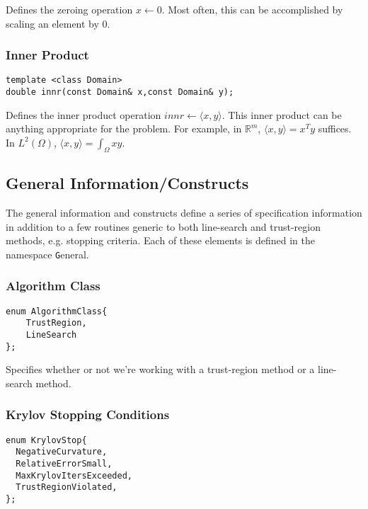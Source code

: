 \documentclass{article}
\newcommand{\re}{\mathbb{R}}
\begin{document}
Defines the zeroing operation $x\leftarrow 0$.  Most often, this can be accomplished by scaling an element by $0$.

\subsubsection{Inner Product}

\begin{flushleft}
\begin{lstlisting}
template <class Domain>
double innr(const Domain& x,const Domain& y);
\end{lstlisting}
\end{flushleft}

Defines the inner product operation $innr\leftarrow \langle x,y\rangle$.  This inner product can be anything appropriate for the problem.  For example, in $\re^m$, $\langle x,y\rangle=x^Ty$ suffices.  In $L^2(\Omega)$, $\langle x,y\rangle=\int_{\Omega} xy$.

\subsection{General Information/Constructs}

	The general information and constructs define a series of specification information in addition to a few routines generic to both line-search and trust-region methods, e.g. stopping criteria.  Each of these elements is defined in the namespace {\texttt General}. 

\subsubsection{Algorithm Class}

\begin{flushleft}
\begin{lstlisting}
enum AlgorithmClass{
    TrustRegion, 
    LineSearch
};
\end{lstlisting}
\end{flushleft}

Specifies whether or not we're working with a trust-region method or a line-search method.

\subsubsection{Krylov Stopping Conditions}

\begin{flushleft}
\begin{lstlisting}
enum KrylovStop{
  NegativeCurvature,        
  RelativeErrorSmall,      
  MaxKrylovItersExceeded,  
  TrustRegionViolated,    
};
\end{lstlisting}
\end{flushleft}
\end{document}
